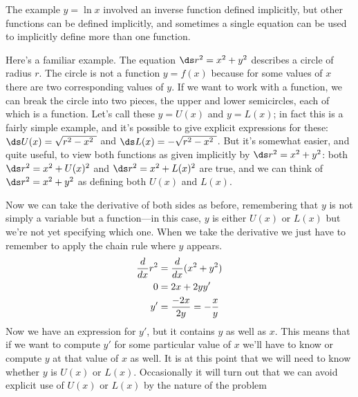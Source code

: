 The example $y=\ln x$ involved an inverse function defined implicitly,
but other functions can be defined implicitly, and sometimes a single
equation can be used to implicitly define more than one
function. 

Here's a familiar example. The equation $\ds r^2=x^2+y^2$
describes a circle of radius $r$. The circle is not a function
$y=f(x)$ because for some values of $x$ there are two corresponding
values of $y$. If we want to work with a function, we can break the
circle into two pieces, the upper and lower semicircles, each of which
is a function. Let's call these $y=U(x)$ and $y=L(x)$; in fact this is
a fairly simple example, and it's possible to give explicit
expressions for these: $\ds U(x)=\sqrt{r^2-x^2\ }$ and
$\ds L(x)=-\sqrt{r^2-x^2\ }$.  But it's somewhat easier, and quite useful,
to view both functions as given implicitly by $\ds r^2=x^2+y^2$: both
$\ds r^2=x^2+U(x)^2$ and $\ds r^2=x^2+L(x)^2$ are true, and we can think of 
$\ds r^2=x^2+y^2$ as defining both $U(x)$ and $L(x)$.

Now we can take the derivative of both sides as before, remembering
that $y$ is not simply a variable but a function---in this case, $y$
is either $U(x)$ or $L(x)$ but we're not yet specifying which one.
When we take the derivative we just have to remember to apply the
chain rule where $y$ appears.
\begin{align*}
{d\over dx}r^2&={d\over dx}(x^2+y^2) \\
0&=2x+2yy' \\
y'&={-2x\over 2y}=-{x\over y} \\
\end{align*}
Now we have an expression for $y'$, but it contains $y$ as well as
$x$. This means that if we want to compute $y'$ for some particular
value of $x$ we'll have to know or compute $y$ at that value of $x$ as
well. It is at this point that we will need to know whether $y$ is
$U(x)$ or $L(x)$. Occasionally it will turn out that we can avoid
explicit use of $U(x)$ or $L(x)$ by the nature of the problem

